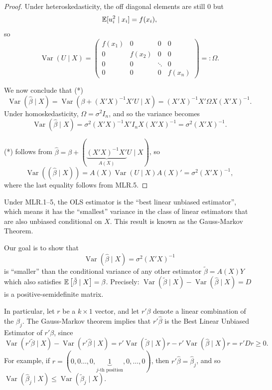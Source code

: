 \begin{proof}
	Under heteroskedasticity, the off diagonal elements are still $0$ but\[\mathbb{E}[u_i^2\mid x_i]=f(x_i),\]so
	\[
		\operatorname{Var}(U\mid X)=
		\begin{pmatrix}
			f(x_1) & 0      & 0      & 0      \\
			0      & f(x_2) & 0      & 0      \\
			0      & 0      & \ddots & 0      \\
			0      & 0      & 0      & f(x_n)
		\end{pmatrix} =: \Omega
		.\]

	We now conclude that (*)
	\[
		\operatorname{Var}(\hat\beta\mid X)=\operatorname{Var}(\beta+(X'X)^{-1}X'U\mid X)=(X'X)^{-1}X'\Omega X(X'X)^{-1}.
	\]
	Under homoskedasticity, $\Omega=\sigma^2I_n$, and so the variance becomes
	\[
		\operatorname{Var}(\hat\beta\mid X)=\sigma^2(X'X)^{-1}X'I_nX(X'X)^{-1}=\sigma^2(X'X)^{-1}.
	\]

	(*) follows from $\hat{\beta} = \beta + \left( \underbrace{\left( X'X \right)^{-1}X'}_{A(X)} U \mid X \right)$, so \[
		\operatorname{Var}\left(\left( \hat{\beta} \mid X \right)\right)= A(X) \operatorname{Var}\left(U \mid X\right) A(X)' = \sigma^2 \left( X'X \right)^{-1}
	,\] where the last equality follows from MLR.5.
\end{proof}

\begin{theorem}
	Under MLR.1--5, the OLS estimator is the ``best linear unbiased estimator'', which means it has the ``smallest'' variance in the class of linear estimators that are also unbiased conditional on $X$. This result is known as the Gauss-Markov Theorem.

	Our goal is to show that
	\[
		\operatorname{Var}(\hat\beta\mid X)=\sigma^2(X'X)^{-1}
	\]
	is ``smaller'' than the conditional variance of any other estimator $\tilde\beta=A(X)Y$ which also satisfies $\mathbb{E}\left[\tilde\beta\mid X\right]=\beta$. Precisely: $\operatorname{Var}(\tilde\beta\mid X)-\operatorname{Var}(\hat\beta\mid X)=D$ is a positive-semidefinite matrix.
\end{theorem}

\begin{remark}	In particular, let $r$ be a $k\times 1$ vector, and let $r'\beta$ denote a linear combination of the $\beta_j$. The Gauss-Markov theorem implies that $r'\hat\beta$ is the Best Linear Unbiased Estimator of $r'\beta$, since
	\[
		\operatorname{Var}(r'\tilde\beta\mid X)-\operatorname{Var}(r'\hat\beta\mid X)=r'\operatorname{Var}(\tilde\beta\mid X)r-r'\operatorname{Var}(\hat\beta\mid X)r=r'Dr\ge 0.
	\]
	For example, if $r=(0,0\ldots,0,\underbrace{1}_{\text{$j$-th position}},0,\ldots,0)$, then $r'\hat\beta=\hat\beta_j$, and so $\operatorname{Var}(\hat\beta_j\mid X)\le\operatorname{Var}(\tilde\beta_j\mid X)$.
\end{remark}

